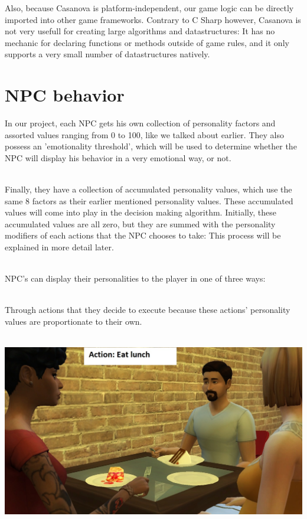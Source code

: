 \documentclass[11pt]{article} %
\begin{document}
Also, because Casanova is platform-independent, our game logic can be directly imported into other game frameworks. Contrary to C Sharp however, Casanova is not very usefull for creating large algorithms and datastructures: It has no mechanic for declaring functions or methods outside of game rules, and it only supports a very small number of datastructures natively. 

\newpage
\section{NPC behavior}
In our project, each NPC gets his own collection of personality factors and assorted values ranging from 0 to 100, like we talked about earlier. They also possess an 'emotionality threshold', which will be used to determine whether the NPC will display his behavior in a very emotional way, or not. 

~\\
Finally, they have a collection of accumulated personality values, which use the same 8 factors as their earlier mentioned personality values. These accumulated values will come into play in the decision making algorithm. Initially, these accumulated values are all zero, but they are summed with the personality modifiers of each actions that the NPC chooses to take: This process will be explained in more detail later.

~\\
NPC's can display their personalities to the player in one of three ways:

~\\
Through actions that they decide to execute because these actions' personality values are proportionate to their own.

~\\
\includegraphics[scale=0.4]{SimsEating}
\end{document}
